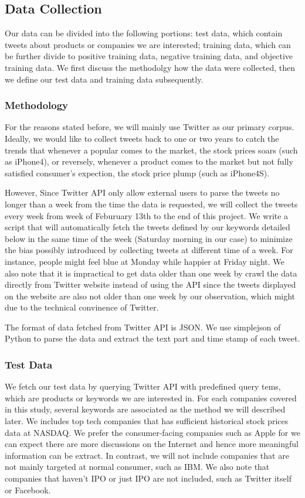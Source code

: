 \documentclass[12pt]{article}
\begin{document}
\subsection{Data Collection}\label{data-collection}
Our data can be divided into the following portions: test data, which contain tweets about products or companies we are interested; training data, which can be further divide to positive training data, negative training data, and objective training data. We first discuss the methodolgy how the data were collected, then we define our test data and training data subsequently.

\subsubsection{Methodology}
For the reasons stated before, we will mainly use Twitter as our primary corpus. Ideally, we would like to collect tweets back to one or two years to catch the trends that whenever a popular comes to the market, the stock prices soars (such as iPhone4), or reversely, whenever a product comes to the market but not fully satisfied consumer's expection, the stock price plump (such as iPhone4S). 

However, Since Twitter API only allow external users to parse the tweets no longer than a week from the time the data is requested, we will collect the tweets every week from week of Feburuary 13th to the end of this project. We write a script that will automatically fetch the tweets defined by our keywords detailed below in the same time of the week (Saturday morning in our case) to minimize the bias possibly introduced by collecting tweets at different time of a week. For instance, people might feel blue at Monday while happier at Friday night. We also note that it is impractical to get data older than one week by crawl the data directly from Twitter website instead of using the API since the tweets displayed on the website are also not older than one week by our observation, which might due to the technical convinence of Twitter.

The format of data fetched from Twitter API is JSON. We use simplejson of Python to parse the data and extract the text part and time stamp of each tweet.

\subsubsection{Test Data}
We fetch our test data by querying Twitter API with predefined query tems, which are products or keywords we are interested in. For each companies covered in this study, several keywords are associated as the method we will described later. We includes top tech companies that has sufficient historical stock prices data at NASDAQ. We prefer the consumer-facing companies such as Apple for we can expect there are more discussions on the Internet and hence more meaningful information can be extract. In contrast, we will not include companies that are not mainly targeted at normal consumer, such as IBM. We also note that companies that haven't IPO or just IPO are not included, such as Twitter itself or Facebook.
\end{document}
